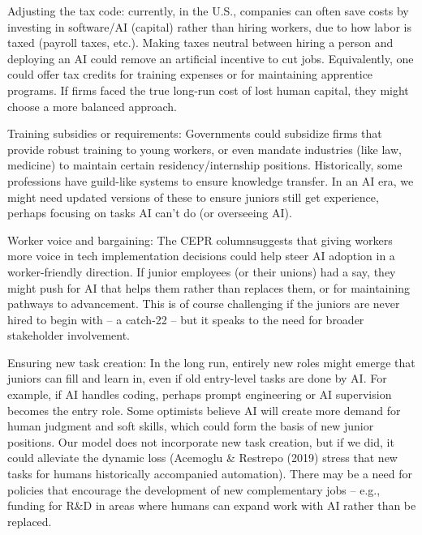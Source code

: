 \documentclass[12pt]{article}
\begin{document}
Adjusting the {tax code}: currently, in the U.S., companies
can often save costs by investing in software/AI (capital) rather
than hiring workers, due to how labor is taxed (payroll taxes,
etc.). Making taxes neutral between hiring a person and deploying an
AI could remove an artificial incentive to cut jobs. Equivalently,
one could offer tax credits for training expenses or for maintaining
apprentice programs. If firms faced the true long-run cost of lost
human capital, they might choose a more balanced approach.

{Training subsidies or requirements}: Governments could
subsidize firms that provide robust training to young workers, or
even mandate industries (like law, medicine) to maintain certain
residency/internship positions. Historically, some professions have
{guild-like systems} to ensure knowledge transfer. In an AI
era, we might need updated versions of these to ensure juniors still
get experience, perhaps focusing on tasks AI can't do (or overseeing
AI).

{Worker voice and bargaining}: The CEPR columnsuggests that
giving workers more voice in tech implementation decisions could
help steer AI adoption in a worker-friendly direction. If junior
employees (or their unions) had a say, they might push for AI that
{helps them} rather than replaces them, or for maintaining
pathways to advancement. This is of course challenging if the
juniors are never hired to begin with -- a catch-22 -- but it speaks
to the need for broader stakeholder involvement.

{Ensuring new task creation}: In the long run, entirely new
roles might emerge that juniors can fill and learn in, even if old
entry-level tasks are done by AI. For example, if AI handles coding,
perhaps {prompt engineering} or {AI supervision} becomes
the entry role. Some optimists believe AI will create more demand
for human judgment and soft skills, which could form the basis of
new junior positions. Our model does not incorporate new task
creation, but if we did, it could alleviate the dynamic loss
(Acemoglu \& Restrepo (2019) stress that new tasks for humans
historically accompanied automation). There may be a need for
{policies that encourage the development of new complementary
jobs} -- e.g., funding for R\&D in areas where humans can expand
work with AI rather than be replaced.
\end{document}
